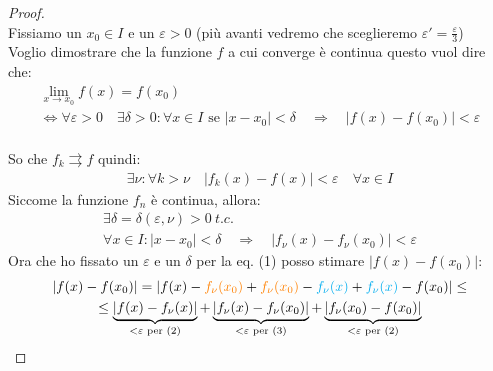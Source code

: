 \documentclass[a4paper, oneside]{article}
\begin{document}
\begin{proof}
    \hfill\\
    Fissiamo un $x_0 \in I$ e un $\varepsilon > 0$ (più avanti vedremo che sceglieremo $\varepsilon' = \frac{\varepsilon}{3}$)\\
    Voglio dimostrare che la funzione $f$ a cui converge è continua questo vuol dire che:
    \begin{equation}
        \begin{gathered}
        \lim_{x \to x_0} f(x) = f(x_0)\\
        \Leftrightarrow \forall \varepsilon > 0 \quad \exists \delta > 0 : \forall x \in I \text{ se } |x-x_0| < \delta \quad \Rightarrow \quad |f(x) - f(x_0)| < \varepsilon
        \end{gathered}
    \end{equation}
    \hfill\\
    So che $f_k \rightrightarrows f$ quindi:
    \begin{equation}
        \begin{gathered}
            \exists \nu : \forall k > \nu \quad |f_k(x) - f(x)| < \varepsilon \quad \forall x \in I
        \end{gathered}
    \end{equation}
    Siccome la funzione $f_n$ è continua, allora:
    \begin{equation}
        \begin{gathered}
            \exists \delta = \delta(\varepsilon, \nu) > 0 \ t.c.\\
            \forall x \in I : |x - x_0| < \delta \quad \Rightarrow \quad |f_{\nu}(x) - f_{\nu}(x_0)| < \varepsilon
        \end{gathered}
    \end{equation}
    Ora che ho fissato un $\varepsilon$ e un $\delta$ per la eq. (1) posso stimare $|f(x) - f(x_0)|$:
    \begin{gather*}
        |f(x) - f(x_0)| = |f(x) - \textcolor{orange}{f_{\nu}(x_0)} + \textcolor{orange}{f_{\nu}(x_0)}  - \textcolor{cyan}{f_{\nu}(x)} + \textcolor{cyan}{f_{\nu}(x)} - f(x_0)| \leq\\
        \leq \underbrace{|f(x) - f_{\nu}(x)|}_{< \varepsilon \text{ per (2)}} + \underbrace{|f_{\nu}(x) - f_{\nu}(x_0)|}_{< \varepsilon \text{ per (3)}} + \underbrace{|f_{\nu}(x_0) - f(x_0)|}_{< \varepsilon \text{ per (2)}} \\

\end{gather*}
\end{proof}
\end{document}

